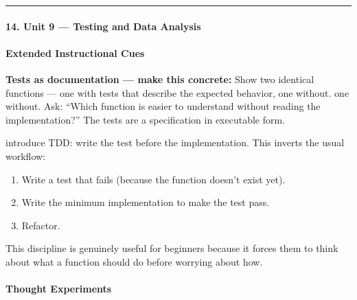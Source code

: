 \documentclass[
  justified,
  openright,
]{tufte-book}
\let\subsection\paragraph
\let\paragraph\paragraph
\let\subsection\paragraph
\let\paragraph\paragraph
\providecommand{\tightlist}{%
  \setlength{\itemsep}{0pt}\setlength{\parskip}{0pt}}
\begin{document}
\begin{center}\rule{0.5\linewidth}{0.5pt}\end{center}

\subsection{14. Unit 9 --- Testing and Data
Analysis}\label{unit-9-testing-and-data-analysis}

\subsection{Extended Instructional
Cues}\label{extended-instructional-cues-2}

\textbf{Tests as documentation --- make this concrete:} Show two
identical functions --- one with tests that describe the expected
behavior, one without. one without.
Ask: ``Which function is easier to understand
without reading the implementation?'' The tests are a specification in
executable form.

introduce TDD: write the test before the implementation.
This inverts the usual workflow:

\begin{enumerate}
\def\labelenumi{\arabic{enumi}.}
\tightlist
\item
  Write a test that fails (because the function doesn't exist yet).
\item
  Write the minimum implementation to make the test pass.
\item
  Refactor.
\end{enumerate}

This discipline is genuinely useful for beginners because it forces them
to think about what a function should do before worrying about how.

\paragraph{Thought Experiments}\label{thought-experiments-16}
\end{document}

